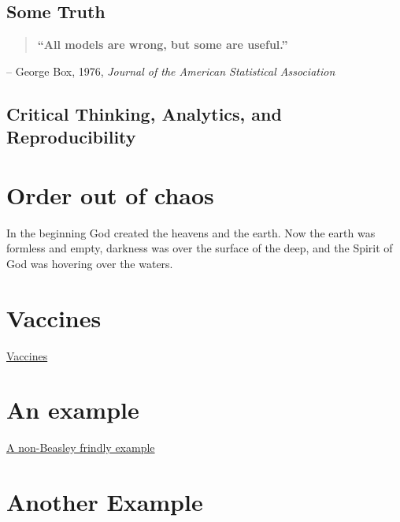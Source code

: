 \documentclass[
]{book}
\begin{document}
\hypertarget{some-truth}{%
\section{Some Truth}\label{some-truth}}

\begin{quote}
\textbf{``All models are wrong, but some are useful.''}
\end{quote}

-- George Box, 1976, \emph{Journal of the American Statistical Association}

\hypertarget{critical-thinking-analytics-and-reproducibility}{%
\section{Critical Thinking, Analytics, and Reproducibility}\label{critical-thinking-analytics-and-reproducibility}}

\hypertarget{order-out-of-chaos}{%
\chapter{Order out of chaos}\label{order-out-of-chaos}}

In the beginning God created the heavens and the earth. Now the earth was formless and empty, darkness was over the surface of the deep, and the Spirit of God was hovering over the waters.

\hypertarget{vaccines}{%
\chapter{Vaccines}\label{vaccines}}

\href{https://www.ncbi.nlm.nih.gov/pmc/articles/PMC5789217/}{Vaccines}

\hypertarget{an-example}{%
\chapter{An example}\label{an-example}}

\href{https://gobluehose.com/news/2023/2/1/bevy-of-newcomers-join-pc-football-program-on-national-signing-day.aspx}{A non-Beasley frindly example}

\hypertarget{another-example}{%
\chapter{Another Example}\label{another-example}}
\end{document}
